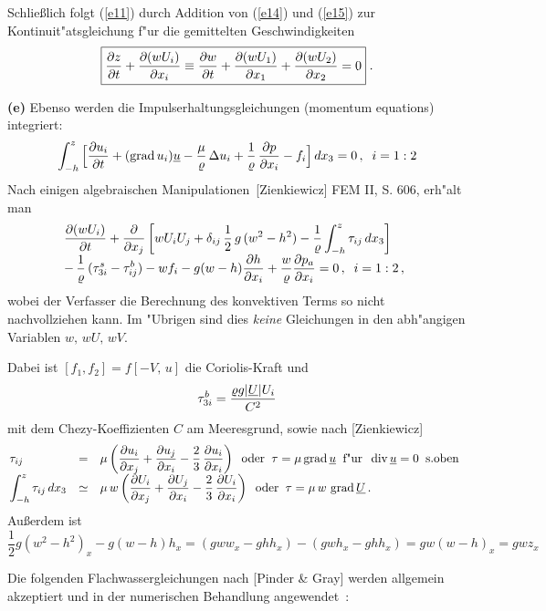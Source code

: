 \documentclass[12pt,a4paper,leqno,twoside]{book}
\begin{document}
Schlie\ss lich folgt (\ref{e11}) durch Addition von (\ref{e14}) und (\ref{e15}) zur Kontinuit"atsgleichung f"ur die gemittelten Geschwindigkeiten
%
\begin{equation}\label{e16}
\fbox{$ \dis
\frac{\da z}{\da t} + \frac{\da (wU_i)}{\da x_i}
\equiv \frac{\da w}{\da t} + \frac{\da (wU_1)}{\da x_1}
+ \frac{\da (wU_2)}{\da x_2} = 0
$}\;.
\end{equation}
\par
{\bf (e)} Ebenso werden die Impulserhaltungsgleichungen (momentum equations)
integriert:
%
\begin{equation}\label{e17}
\int_{-h}^z\Big[
\frac{\da u_i}{\da t} + (\grad u_i)\u - \frac{\mu}{\rho}\,\Delta u_i 
+ \frac{1}{\rho}\,\frac{\da p}{\da x_i} - f_i
\Big]\, dx_3 = 0\,,\;\; i = 1:2
\end{equation}
%
Nach \glqq einigen algebraischen Manipulationen\grqq\ [Zienkiewicz] FEM II, S. 606,
erh"alt man
%
\begin{equation}\label{e18}
\ba{.}{l} \dis
\frac{\da (wU_i)}{\da t} 
+ \frac{\da}{\da x_j}
\left[
wU_iU_j + \delta_{ij}\,\frac12\, g\,(w^2 - h^2)
- \frac{1}{\rho}\int_{-h}^z\tau_{ij}\, dx_3\right]\\[1ex]
\dis
-\, \frac{1}{\rho}\,(\tau^s_{3i} - \tau^b_{ij}) - wf_i - g(w - h)\frac{\da h}{\da x_i}
+ \frac{w}{\rho}\frac{\da p_a}{\da x_i} = 0\,,\;\; i = 1:2\,,
\ea{.}
\end{equation}
wobei der Verfasser die Berechnung des konvektiven Terms so nicht nachvollziehen kann.
Im "Ubrigen sind dies {\em keine} Gleichungen in den abh"angigen Variablen
$w,\, wU,\, wV$.
\par
Dabei ist
$
[f_1, f_2] = f[-V,\, u]
$ die {\sc Coriolis}-Kraft und
\[
\tau^b_{3i} = \frac{\rho g |\ul{U}|U_i}{C^2}
\]
mit dem {\sc Chezy}-Koeffizienten $C$ am Meeresgrund, sowie
nach [Zienkiewicz]
\[
\ba{.}{lll}
\tau_{ij} &=& \dis \mu \left(\frac{\da u_i}{\da x_j} + \frac{\da  u_j}{\da x_i}
- \frac23 \, \frac{\da u_i}{\da x_i}\right)\;\;
\text{oder}\;\; 
\tau = \mu \grad \u \;\; \text{f"ur}\;\; \div \u = 0\;\; \text{s.oben}\\[1ex]
\dis \int_{-h}^z\tau_{ij}\,dx_3
&\simeq& \dis \mu \, w
\left(\frac{\da U_i}{\da x_j} + \frac{\da  U_j}{\da x_i}
- \frac23 \, \frac{\da U_i}{\da x_i}\right)
\;\; \text{oder}\;\;
\tau = \mu\,w\, \grad \ul{U}
\,.
\ea{.}
\]
Au\ss erdem ist
\[
\frac12 g(w^2 - h^2)_x - g(w - h)h_x
= (gww_x - ghh_x) - (gwh_x - ghh_x) = gw(w - h)_x = gwz_x
\]

Die folgenden Flachwassergleichungen nach [Pinder \& Gray]
werden allgemein akzeptiert und in der numerischen Behandlung angewendet\,
:
\end{document}
